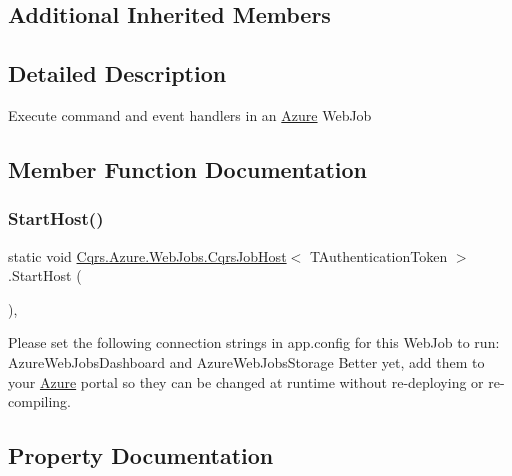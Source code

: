 \subsection*{Additional Inherited Members}


\subsection{Detailed Description}
Execute command and event handlers in an \hyperlink{namespaceCqrs_1_1Azure}{Azure} Web\+Job 



\subsection{Member Function Documentation}
\mbox{\label{classCqrs_1_1Azure_1_1WebJobs_1_1CqrsJobHost_a836ef65628bb4b63942beedfb17f1269_a836ef65628bb4b63942beedfb17f1269}} 
\subsubsection{\texorpdfstring{Start\+Host()}{StartHost()}}
{\footnotesize\ttfamily static void \hyperlink{classCqrs_1_1Azure_1_1WebJobs_1_1CqrsJobHost}{Cqrs.\+Azure.\+Web\+Jobs.\+Cqrs\+Job\+Host}$<$ T\+Authentication\+Token $>$.Start\+Host (\begin{DoxyParamCaption}{ }\end{DoxyParamCaption})\hspace{0.3cm}{\ttfamily [static]}, {\ttfamily [protected]}}

Please set the following connection strings in app.\+config for this Web\+Job to run\+: Azure\+Web\+Jobs\+Dashboard and Azure\+Web\+Jobs\+Storage Better yet, add them to your \hyperlink{namespaceCqrs_1_1Azure}{Azure} portal so they can be changed at runtime without re-\/deploying or re-\/compiling. 

\subsection{Property Documentation}
\mbox{\label{classCqrs_1_1Azure_1_1WebJobs_1_1CqrsJobHost_a840ffdd7a98109cce3efd3ae3562941e_a840ffdd7a98109cce3efd3ae3562941e}} 
